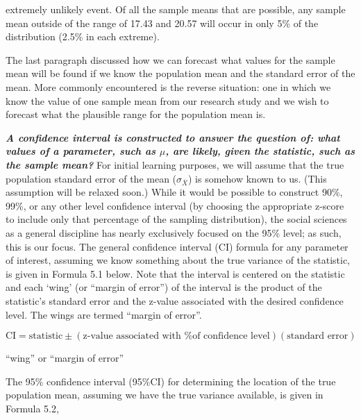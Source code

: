 \documentclass[12pt]{article}
\begin{document}
\newpage


extremely unlikely event. Of all the sample means that are possible, any sample mean
outside of the range of 17.43 and 20.57 will occur in only 5\% of the distribution (2.5\% in
each extreme).

The last paragraph discussed how we can forecast what values for the sample mean
will be found if we know the population mean and the standard error of the mean. More
commonly encountered is the reverse situation: one in which we know the value of one
sample mean from our research study and we wish to forecast what the plausible range for
the population mean is.

\textbf{\textit{A confidence interval is constructed to answer the question of: what values of a
parameter, such as $\mu$, are likely, given the statistic, such as the sample mean?}} For initial
learning purposes, we will assume that the true population standard error of the mean ($\sigma_{\bar{X}}$)
is somehow known to us. (This assumption will be relaxed soon.) While it would be
possible to construct 90\%, 99\%, or any other level confidence interval (by choosing the
appropriate z-score to include only that percentage of the sampling distribution), the social
sciences as a general discipline has nearly exclusively focused on the 95\% level; as such,
this is our focus. The general confidence interval (CI) formula for any parameter of interest,
assuming we know something about the true variance of the statistic, is given in Formula
5.1 below. Note that the interval is centered on the statistic and each `wing' (or ``margin of
error'') of the interval is the product of the statistic's standard error and the z-value
associated with the desired confidence level. The wings are termed ``margin of error''.

\begin{equation}
\text{CI} = \text{statistic} \pm \left( \text{z-value associated with \% of confidence level} \right)\!\left( \text{standard error} \right) \tag{5.1}
\end{equation}

\begin{center}
``wing'' or ``margin of error''
\end{center}

The 95\% confidence interval (95\%CI) for determining the location of the true
population mean, assuming we have the true variance available, is given in Formula 5.2,
\end{document}
